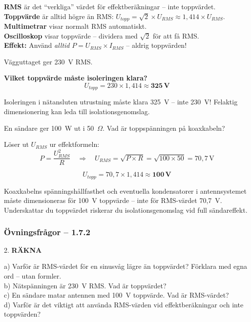 \documentclass[a4paper,11pt,twoside]{book}
\newcommand{\emoji}[1]{{\emojifont #1}}
\newcommand{\qrakna}{\colorbox{bluepale}{\textcolor{bluedark}{\headingfont\bfseries\tiny RÄKNA}}}
\begin{document}
\begin{bluebox}[title={\emoji{🔑} Nyckelsamband -- RMS}]
\textbf{RMS} är det ``verkliga'' värdet för effektberäkningar -- inte toppvärdet.\\
\textbf{Toppvärde} är alltid högre än RMS: $U_{topp} = \sqrt{2} \times U_{RMS} \approx 1{,}414 \times U_{RMS}$.\\
\textbf{Multimetrar} visar normalt RMS automatiskt.\\
\textbf{Oscilloskop} visar toppvärde -- dividera med $\sqrt{2}$ för att få RMS.\\
\textbf{Effekt:} Använd \emph{alltid} $P = U_{RMS} \times I_{RMS}$ -- aldrig toppvärden!
\end{bluebox}

\begin{worked}[title={Räkneexempel 1.7.2a -- Nätspänningens toppvärde}]
Vägguttaget ger 230~V RMS.

\textbf{Vilket toppvärde måste isoleringen klara?}
\[ U_{topp} = 230 \times 1{,}414 \approx \mathbf{325\,\text{V}} \]

Isoleringen i nätansluten utrustning måste klara
325~V -- inte 230~V! Felaktig dimensionering kan
leda till isolationsgenomslag.
\end{worked}

\begin{worked}[title={Räkneexempel 1.7.2b -- Toppspänning på koaxkabeln}]
En sändare ger 100~W ut i 50~$\Omega$.
Vad är toppspänningen på koaxkabeln?

Löser ut $U_{RMS}$ ur effektformeln:
\[ P = \frac{U_{RMS}^2}{R}
   \quad\Rightarrow\quad
   U_{RMS} = \sqrt{P \times R} = \sqrt{100 \times 50} = 70{,}7\,\text{V} \]

\[ U_{topp} = 70{,}7 \times 1{,}414 \approx \mathbf{100\,\text{V}} \]

Koaxkabelns spänningshållfasthet och eventuella
kondensatorer i antennsystemet måste dimensioneras
för 100~V toppvärde -- inte för RMS-värdet 70{,}7~V.
Underskattar du toppvärdet riskerar du isolationsgenomslag
vid full sändareffekt.
\end{worked}

\subsubsection*{Övningsfrågor -- 1.7.2}

\begin{qblock}{2.}
\qrakna\quad

a) Varför är RMS-värdet för en sinusvåg lägre än
toppvärdet? Förklara med egna ord -- utan formler.\\
b) Nätspänningen är 230~V RMS. Vad är toppvärdet?\\
c) En sändare matar antennen med 100~V toppvärde.
Vad är RMS-värdet?\\
d) Varför är det viktigt att använda RMS-värden
vid effektberäkningar och inte toppvärden?
\end{qblock}
\end{document}
